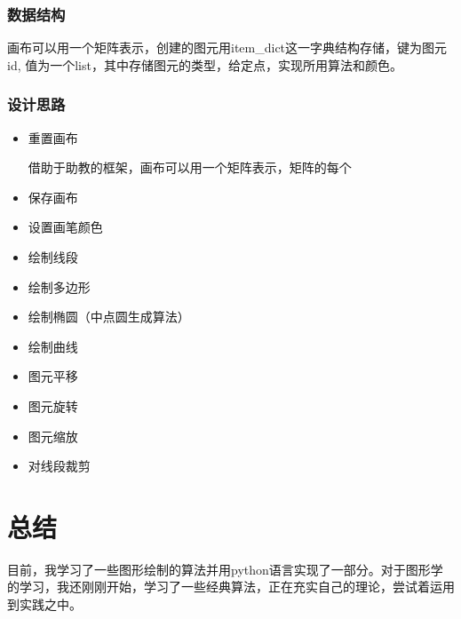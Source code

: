 \documentclass[a4paper,UTF8]{article}
\theoremstyle{definition}
\begin{document}
\subsubsection{数据结构}
画布可以用一个矩阵表示，创建的图元用item\_dict这一字典结构存储，键为图元id,
值为一个list，其中存储图元的类型，给定点，实现所用算法和颜色。
\subsubsection{设计思路}
\begin{itemize}
  \item []
  重置画布

  借助于助教的框架，画布可以用一个矩阵表示，矩阵的每个
  
  \item []
  保存画布
  
  \item []
  设置画笔颜色

  \item []
  绘制线段

  \item []
 绘制多边形
  
  \item []
  绘制椭圆（中点圆生成算法）
  
  \item []
  绘制曲线
  
  \item []
  图元平移
  
  \item []
  图元旋转
  
  \item []
  图元缩放

  \item []
  对线段裁剪
  
\end{itemize}
\section{总结}
目前，我学习了一些图形绘制的算法并用python语言实现了一部分。对于图形学的学习，我还刚刚开始，学习了一些经典算法，正在充实自己的理论，尝试着运用到实践之中。
%



%
%
\end{document}
